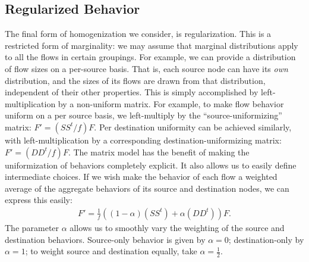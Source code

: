 \documentclass[twocolumn,final]{svjour3}
\begin{document}
\subsection{Regularized Behavior}

The final form of homogenization we consider, is regularization. This is a restricted form of marginality: we may assume that marginal distributions apply to all the flows in certain groupings. For example, we can provide a distribution of flow sizes on a per-source basis. That is, each source node can have its \textit{own} distribution, and the sizes of its flows are drawn from that distribution, independent of their other properties. This is simply accomplished by left-multiplication by a non-uniform matrix. For example, to make flow behavior uniform on a per source basis, we left-multiply by the ``source-uniformizing'' matrix: $F'=(SS^t/f)F$. Per destination uniformity can be achieved similarly, with left-multiplication by a corresponding destination-uniformizing matrix: $F'=(DD^t/f)F$.
The matrix model has the benefit of making the uniformization of behaviors completely explicit. It also allows us to easily define intermediate choices. If we wish make the behavior of each flow a weighted average of the aggregate behaviors of its source and destination nodes, we can express this easily:
\begin{align}
F' = \frac{1}{f}((1-\alpha)(SS^t)+\alpha(DD^t))F.
\end{align}
The parameter $\alpha$ allows us to smoothly vary the weighting of the source and destination behaviors. Source-only behavior is given by $\alpha=0$; destination-only by $\alpha=1$; to weight source and destination equally, take $\alpha=\frac{1}{2}$.

\end{document}
